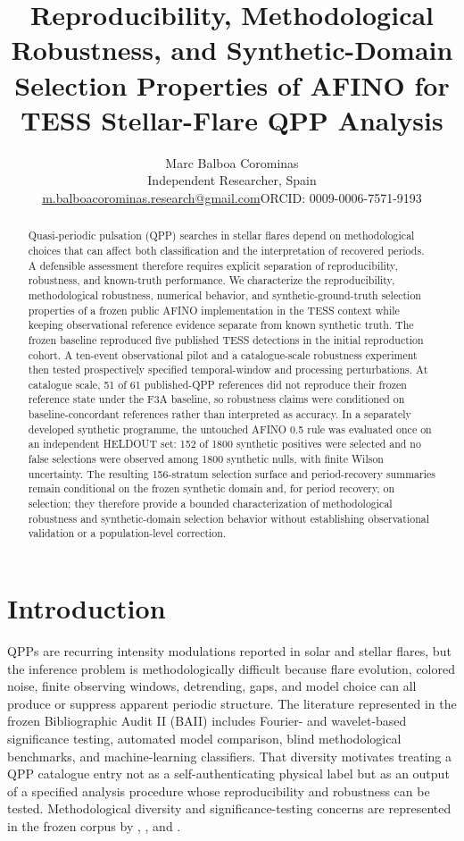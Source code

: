 \documentclass[11pt,a4paper]{article}
\title{Reproducibility, Methodological Robustness, and Synthetic-Domain Selection Properties of AFINO for TESS Stellar-Flare QPP Analysis}
\author{Marc Balboa Corominas\\\small Independent Researcher, Spain\\\small \href{mailto:m.balboacorominas.research@gmail.com}{m.balboacorominas.research@gmail.com}\quad ORCID: 0009-0006-7571-9193}
\date{}
\begin{document}
\maketitle
\begin{abstract}
Quasi-periodic pulsation (QPP) searches in stellar flares depend on methodological choices that can affect both classification and the interpretation of recovered periods. A defensible assessment therefore requires explicit separation of reproducibility, robustness, and known-truth performance. We characterize the reproducibility, methodological robustness, numerical behavior, and synthetic-ground-truth selection properties of a frozen public AFINO implementation in the TESS context while keeping observational reference evidence separate from known synthetic truth. The frozen baseline reproduced five published TESS detections in the initial reproduction cohort. A ten-event observational pilot and a catalogue-scale robustness experiment then tested prospectively specified temporal-window and processing perturbations. At catalogue scale, 51 of 61 published-QPP references did not reproduce their frozen reference state under the F3A baseline, so robustness claims were conditioned on baseline-concordant references rather than interpreted as accuracy. In a separately developed synthetic programme, the untouched AFINO 0.5 rule was evaluated once on an independent HELDOUT set: 152 of 1800 synthetic positives were selected and no false selections were observed among 1800 synthetic nulls, with finite Wilson uncertainty. The resulting 156-stratum selection surface and period-recovery summaries remain conditional on the frozen synthetic domain and, for period recovery, on selection; they therefore provide a bounded characterization of methodological robustness and synthetic-domain selection behavior without establishing observational validation or a population-level correction.
\end{abstract}

\section{Introduction}
QPPs are recurring intensity modulations reported in solar and stellar flares, but the inference problem is methodologically difficult because flare evolution, colored noise, finite observing windows, detrending, gaps, and model choice can all produce or suppress apparent periodic structure. The literature represented in the frozen Bibliographic Audit II (BAII) includes Fourier- and wavelet-based significance testing, automated model comparison, blind methodological benchmarks, and machine-learning classifiers. That diversity motivates treating a QPP catalogue entry not as a self-authenticating physical label but as an output of a specified analysis procedure whose reproducibility and robustness can be tested. Methodological diversity and significance-testing concerns are represented in the frozen corpus by \citet{Inglis2016}, \citet{Pugh2017}, and \citet{Broomhall2019}.
\end{document}
